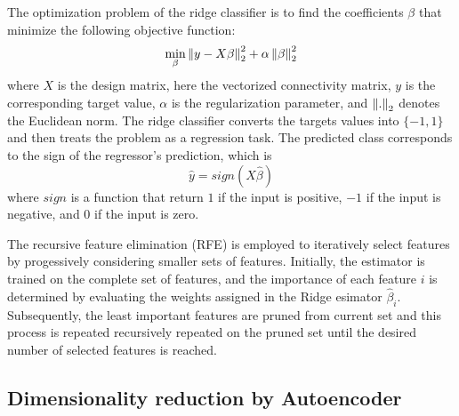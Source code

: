 The optimization problem of the ridge classifier is to find the coefficients $\beta$ that minimize the following objective function:
$$
\min_{\beta} \left\lVert y - X\beta\right\rVert_2^2 + \alpha \left\lVert\beta\right\rVert_2^2
$$
where $X$ is the design matrix, here the vectorized connectivity matrix, $y$ is the corresponding target value, $\alpha$ is the regularization parameter, and $\left\lVert.\right\rVert_2$ denotes the Euclidean norm. The ridge classifier converts the targets values into $\{-1, 1\}$ and then treats the problem as a regression task. The predicted class corresponds to the sign of the regressor's prediction, which is
$$
\hat{y} = sign(X\hat{\beta})
$$
where $sign$ is a function that return $1$ if the input is positive, $-1$ if the input is negative, and $0$ if the input is zero.

The recursive feature elimination (RFE) is employed to iteratively select features by progessively considering smaller sets of features. Initially, the estimator is trained on the complete set of features, and the importance of each feature $i$ is determined by evaluating the weights assigned in the Ridge esimator $\hat{\beta}_i$. Subsequently, the least important features are pruned from current set and this process is repeated recursively repeated on the pruned set until the desired number of selected features is reached.


\subsection{Dimensionality reduction by Autoencoder}



